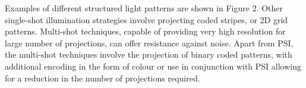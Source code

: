 \documentclass[class=article, crop=false]{standalone}
\begin{document}
\par
Examples of different structured light patterns are shown in Figure 2. Other single-shot illumination strategies involve projecting coded stripes, or 2D grid patterns. Multi-shot techniques, capable of providing very high resolution for large number of projections, can offer resistance against noise. Apart from PSI, the multi-shot techniques involve the projection of binary coded patterns, with additional encoding in the form of colour or use in conjunction with PSI allowing for a reduction in the number of projections required.



	
\end{document}
